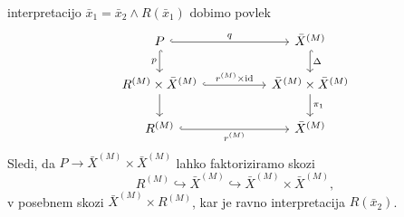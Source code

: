 \documentclass[../kategoricna_logika.tex]{subfiles}
\begin{document}
\begin{dokaz}
\begin{itemize}
    interpretacijo $\bar{x}_1 = \bar{x}_2 \land R(\bar{x}_1)$ dobimo povlek
    \begin{equation*}
      \begin{tikzcd}[column sep=5em]
        P \ar[d, hook, "p"'] \ar[r, hook, "q"] & \bar{X}^{(M)} \ar[d, hook, "\Delta"] \\
        R^{(M)} \times \bar{X}^{(M)} \ar[d] \ar[r, hook, "r^{(M)}
        \times \mathrm{id}"] &
        \bar{X}^{(M)} \times \bar{X}^{(M)} \ar[d, "\pi_1"] \\
        R^{(M)} \ar[r, hook, "r^{(M)}"'] & \bar{X}^{(M)}
      \end{tikzcd}
    \end{equation*}
    Sledi, da $P \to \bar{X}^{(M)} \times \bar{X}^{(M)}$ lahko
    faktoriziramo skozi
    \[R^{(M)} \hookrightarrow \bar{X}^{(M)} \hookrightarrow
      \bar{X}^{(M)} \times \bar{X}^{(M)},\] v posebnem skozi
    $\bar{X}^{(M)} \times R^{(M)}$, kar je ravno interpretacija
    $R(\bar{x}_2)$.\qedhere
  \end{itemize}
\end{dokaz}
%
\end{document}

